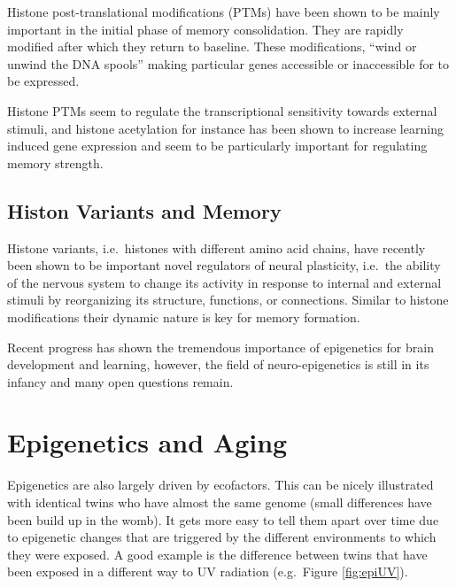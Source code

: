 \documentclass[
  11pt,
]{book}
\begin{document}
Histone post-translational modifications (PTMs) have been shown to be mainly important in the initial phase of memory consolidation. They are rapidly modified after which they return to baseline. These modifications, ``wind or unwind the DNA spools'' making particular genes accessible or inaccessible for to be expressed.

Histone PTMs seem to regulate the transcriptional sensitivity towards external stimuli, and histone acetylation for instance has been shown to increase learning induced gene expression and seem to be particularly important for regulating memory strength.

\hypertarget{histon-variants-and-memory}{%
\subsection{Histon Variants and Memory}\label{histon-variants-and-memory}}

Histone variants, i.e.~histones with different amino acid chains, have recently been shown to be important novel regulators of neural plasticity, i.e.~the ability of the nervous system to change its activity in response to internal and external stimuli by reorganizing its structure, functions, or connections. Similar to histone modifications their dynamic nature is key for memory formation.

Recent progress has shown the tremendous importance of epigenetics for brain development and learning, however, the field of neuro-epigenetics is still in its infancy and many open questions remain.

\hypertarget{epigenetics-and-aging}{%
\section{Epigenetics and Aging}\label{epigenetics-and-aging}}

Epigenetics are also largely driven by ecofactors. This can be nicely illustrated with identical twins who have almost the same genome (small differences have been build up in the womb). It gets more easy to tell them apart over time due to epigenetic changes that are triggered by the different environments to which they were exposed. A good example is the difference between twins that have been exposed in a different way to UV radiation (e.g.~Figure \ref{fig:epiUV}).
\end{document}
